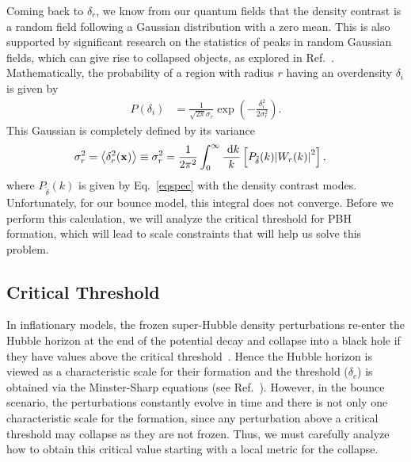 \documentclass[a4paper,11pt]{article}
\renewcommand{\vec}{\mathbf}
\begin{document}
Coming back to $\delta_r$, we know from our quantum fields that the density contrast is a random field following a Gaussian distribution with a zero mean. This is also supported by significant research on the statistics of peaks in random Gaussian fields, which can give rise to collapsed objects, as explored in Ref.~\cite{Bardeen1986statistics}. Mathematically, the probability of a region with radius $r$ having an overdensity $\delta_i$ is given by
\begin{align}
	\label{gaussdelta}
	P(\delta_i) & = \frac{1}{\sqrt{2\pi} \sigma_r} \exp(-\frac{\delta^2_i}{2 \sigma_r^2})
	.\end{align}
This Gaussian is completely defined by its variance
\begin{align}
	\label{eqsigmar}
	\sigma_r^2 & =\left< \delta_r^2(\vec{x}) \right> \equiv \sigma_r^2 = \frac{1}{2\pi^2} \int_0^\infty \frac{ \mathrm{~d}{k}}{k}\left[ P_{\tilde{\delta}}(k) \abs{W_r(k)}^2\right]
	,\end{align}
where $P_{\tilde{\delta}}(k)$ is given by Eq.~\eqref{eqspec} with the density contrast modes. Unfortunately, for our bounce model, this integral does not converge. Before we perform this calculation, we will analyze the critical threshold for PBH formation, which will lead to scale constraints that will help us solve this problem.
\subsection{Critical Threshold}

\label{critical_delta}
In inflationary models, the frozen super-Hubble density perturbations re-enter the Hubble horizon at the end of the potential decay and collapse into a black hole if they have values above the critical threshold~\cite{Martin2014}. Hence the Hubble horizon is viewed as a characteristic scale for their formation and the threshold ($\delta_c$) is obtained via the Minster-Sharp equations (see Ref.~\cite{Musco2019}). However, in the bounce scenario, the perturbations constantly evolve in time and there is not only one characteristic scale for the formation, since any perturbation above a critical threshold may collapse as they are not frozen. Thus, we must carefully analyze how to obtain this critical value starting with a local metric for the collapse.
\end{document}
